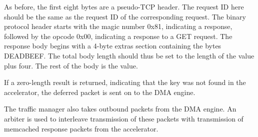 As before, the first eight bytes are a pseudo-TCP header. The request ID here
should be the same as the request ID of the corresponding request.
The binary protocol header starts with the magic number 0x81, indicating a
response, followed by the opcode 0x00, indicating a response to a GET request.
The response body begins with a 4-byte extras section containing the bytes
DEADBEEF. The total body length should thus be set to the length of the value
plus four. The rest of the body is the value.

If a zero-length result is returned, indicating that the key was not found in
the accelerator, the deferred packet is sent on to the DMA engine.

The traffic manager also takes outbound packets from the DMA engine. An arbiter
is used to interleave transmission of these packets with transmission of
memcached response packets from the accelerator.
